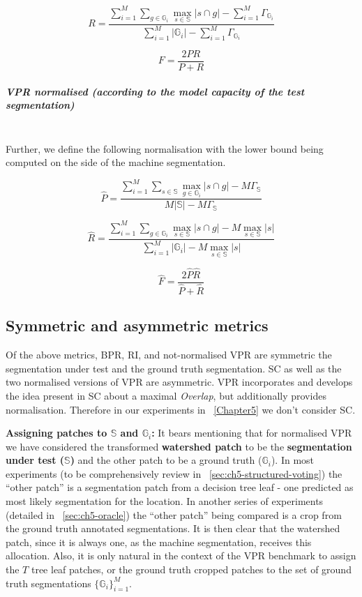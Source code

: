 \[
R=\frac{\sum\limits _{i=1}^{M}\sum\limits _{g\in\mathbb{G}_{i}}\max\limits _{s\in\mathbb{S}}\left|s\cap g\right|-\boxed{\sum\limits _{i=1}^{M}\Gamma_{\mathbb{G}_{i}}}}{\sum\limits _{i=1}^{M}\left|\mathbb{G}_{i}\right|-\boxed{\sum\limits _{i=1}^{M}\Gamma_{\mathbb{G}_{i}}}}
\]

\[
F=\frac{2PR}{P+R}
\]

\subparagraph*{VPR normalised (according to the model capacity of the test segmentation)}\mbox{}\\ %
Further, we define the following normalisation with the lower bound being computed on the side of the machine segmentation.

\[
\hat{P}=\frac{\sum\limits _{i=1}^{M}\sum\limits _{s\in\mathbb{S}}\max\limits _{g\in\mathbb{G}_{i}}\left|s\cap g\right|-\boxed{M\Gamma_{\mathbb{S}}}}{M\left|\mathbb{S}\right|-\boxed{M\Gamma_{\mathbb{S}}}}
\]

\[
\hat{{R}}=\frac{\sum\limits _{i=1}^{M}\sum\limits _{g\in\mathbb{G}_{i}}\max\limits _{s\in\mathbb{S}}\left|s\cap g\right|-\boxed{M\max_{s\in\mathbb{S}}\left|s\right|}}{\sum\limits _{i=1}^{M}\left|\mathbb{G}_{i}\right|-\boxed{M\max_{s\in\mathbb{S}}\left|s\right|}}
\]

\[
\hat{{F}}=\frac{2\hat{P}\hat{R}}{\hat{P}+\hat{R}}
\]

\subsection*{Symmetric and asymmetric metrics}
Of the above metrics, BPR, RI, and not-normalised VPR are symmetric \wrt the segmentation under test and the ground truth segmentation. SC as well as the two normalised versions of VPR are asymmetric. VPR incorporates and develops the idea present in SC about a maximal \textit{Overlap}, but additionally provides normalisation. Therefore in our experiments in \textsection~\ref{Chapter5} we don't consider SC.


\textbf{Assigning patches to $\mathbb{S}$ and $\mathbb{G}_i$:} It bears mentioning %
that for normalised VPR we have considered the transformed \textbf{watershed patch} to be the \textbf{segmentation under test ($\mathbb{S}$)} and the other patch to be a ground truth ($\mathbb{G}_i$). 
In most experiments (to be comprehensively %
review in \textsection~\ref{sec:ch5-structured-voting}) the ``other patch'' is a segmentation patch from a decision tree leaf - one predicted as most likely segmentation for the location. In another series of experiments (detailed in \textsection~\ref{sec:ch5-oracle}) the ``other patch'' being compared is a crop from the ground truth annotated segmentations.
It is then clear that the watershed patch, since it is always one, as the machine segmentation, receives this allocation. Also, it is only natural in the context of the VPR benchmark to assign the $T$ tree leaf patches, or the ground truth cropped patches to the set of ground truth segmentations $\{\mathbb{G}_i\}_{i=1}^M$.

